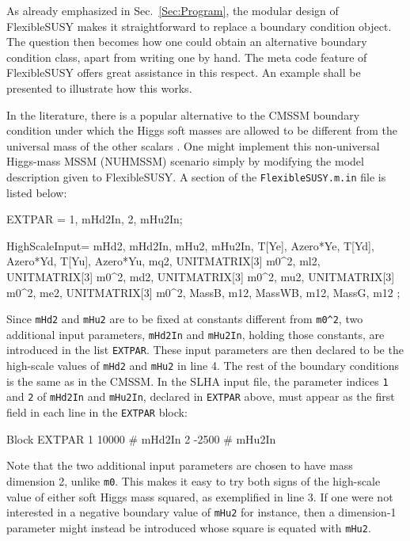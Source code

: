 \documentclass[final,3p,11pt,pdflatex]{elsarticle}
\makeatletter
\newcommand{\fs}{FlexibleSUSY\@\xspace}
\newcommand{\code}[1]{\lstinline|#1|}  %
\newcommand{\secref}[1]{Sec.~\ref{#1}}
\makeatother
\begin{document}
As already emphasized in \secref{Sec:Program}, the modular design of
\fs makes it straightforward %
to replace a boundary condition object.
The question then becomes how
one could obtain an alternative boundary condition class,
apart from writing one by hand.
The meta code feature of \fs offers great assistance
in this respect.
An example shall be presented to illustrate how this works.

In the literature,
there is a popular alternative to the CMSSM boundary condition
under which the Higgs soft masses are allowed to be different from
the universal mass of the other scalars \cite{NUHM}.
One might implement
this non-universal Higgs-mass MSSM (NUHMSSM) scenario
simply by modifying the model description given to \fs.
A section of the \code{FlexibleSUSY.m.in} file is listed below:
\begin{numlstlisting}
EXTPAR = {{1, mHd2In}, {2, mHu2In}};

HighScaleInput={
  {mHd2, mHd2In}, {mHu2, mHu2In},
  {T[Ye], Azero*Ye}, {T[Yd], Azero*Yd}, {T[Yu], Azero*Yu},
  {mq2, UNITMATRIX[3] m0^2}, {ml2, UNITMATRIX[3] m0^2}, {md2, UNITMATRIX[3] m0^2},
  {mu2, UNITMATRIX[3] m0^2}, {me2, UNITMATRIX[3] m0^2},
  {MassB, m12}, {MassWB, m12}, {MassG, m12}
};
\end{numlstlisting}
Since \code{mHd2} and \code{mHu2} are to be fixed at constants
different from \code{m0^2},
two additional input parameters,
\code{mHd2In} and \code{mHu2In}, holding those constants,
are introduced in the list \code{EXTPAR}.
These input parameters are then declared to be the high-scale values of
\code{mHd2} and \code{mHu2} in line 4.
The rest of the boundary conditions is the same as in the CMSSM\@.
In the SLHA input file,
the parameter indices \code{1} and \code{2} of
\code{mHd2In} and \code{mHu2In}, declared in \code{EXTPAR} above,
must appear
as the first field in each line in the \code{EXTPAR} block:
\begin{numlstlisting}
Block EXTPAR
    1   10000                # mHd2In
    2   -2500                # mHu2In
\end{numlstlisting}
Note that the two additional input parameters are chosen to have
mass dimension 2, unlike \code{m0}.
This makes it easy to
try both signs of the high-scale value of either soft Higgs mass squared,
as exemplified in line 3.
If one were not interested in a negative boundary value of \code{mHu2}
for instance,
then a dimension-1 parameter %
might instead be introduced whose square is equated with \code{mHu2}.
\end{document}
